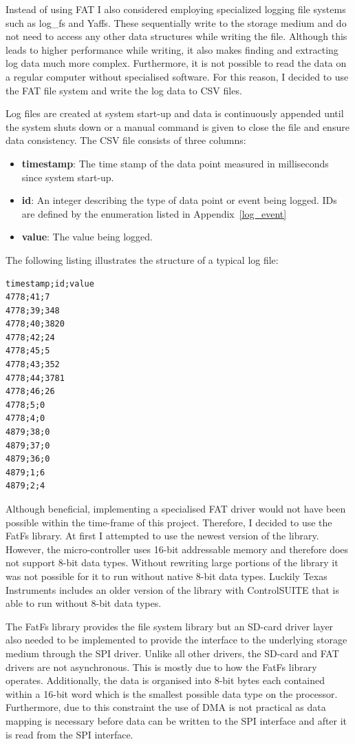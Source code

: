 Instead of using FAT I also considered employing specialized logging file systems such as log\_fs\cite{log_fs} and Yaffs\cite{yaffs}. These sequentially write to the storage medium and do not need to access any other data structures while writing the file. Although this leads to higher performance while writing, it also makes finding and extracting log data much more complex. Furthermore, it is not possible to read the data on a regular computer without specialised software. For this reason, I decided to use the FAT file system and write the log data to CSV files.

Log files are created at system start-up and data is continuously appended until the system shuts down or a manual command is given to close the file and ensure data consistency. The CSV file consists of three columns:

\begin{itemize}
    \item \textbf{timestamp}: The time stamp of the data point measured in milliseconds since system start-up.
    \item \textbf{id}: An integer describing the type of data point or event being logged. IDs are defined by the enumeration listed in Appendix~\ref{log_event}
    \item \textbf{value}: The value being logged.
\end{itemize}

The following listing illustrates the structure of a typical log file:

\begin{verbatim}
timestamp;id;value
4778;41;7
4778;39;348
4778;40;3820
4778;42;24
4778;45;5
4778;43;352
4778;44;3781
4778;46;26
4778;5;0
4778;4;0
4879;38;0
4879;37;0
4879;36;0
4879;1;6
4879;2;4
\end{verbatim}

Although beneficial, implementing a specialised FAT driver would not have been possible within the time-frame of this project. Therefore, I decided to use the FatFs\cite{fatfs} library. At first I attempted to use the newest version of the library. However, the micro-controller uses 16-bit addressable memory and therefore does not support 8-bit data types. Without rewriting large portions of the library it was not possible for it to run without native 8-bit data types. Luckily Texas Instruments includes an older version of the library with ControlSUITE\cite{controlsuite} that is able to run without 8-bit data types.

The FatFs library provides the file system library but an SD-card driver layer also needed to be implemented to provide the interface to the underlying storage medium through the SPI driver. Unlike all other drivers, the SD-card and FAT drivers are not asynchronous. This is mostly due to how the FatFs library operates. Additionally, the data is organised into 8-bit bytes each contained within a 16-bit word which is the smallest possible data type on the processor. Furthermore, due to this constraint the use of DMA is not practical as data mapping is necessary before data can be written to the SPI interface and after it is read from the SPI interface.

